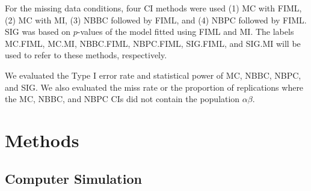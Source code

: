 \documentclass[man]{apa7}\usepackage[]{graphicx}\usepackage[]{xcolor}
\begin{document}
For the missing data conditions, four CI methods were used (1) MC with FIML, (2) MC with MI, (3) NBBC followed by FIML, and (4) NBPC followed by FIML.
SIG was based on $p$-values of the model fitted using FIML and MI.
The labels MC.FIML, MC.MI, NBBC.FIML, NBPC.FIML, SIG.FIML, and SIG.MI will be used to refer to these methods, respectively.

We evaluated the Type I error rate and statistical power of MC, NBBC, NBPC, and SIG.
We also evaluated the miss rate or the proportion of replications where the MC, NBBC, and NBPC CIs
did not contain the population $\alpha \beta$.

\section{Methods}

\subsection{Computer Simulation}
\end{document}
